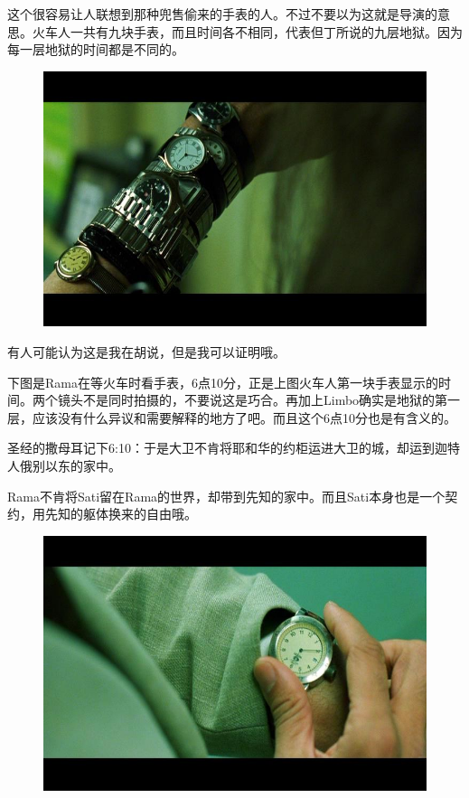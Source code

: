 \documentclass[UTF8]{ctexart}
\begin{document}
这个很容易让人联想到那种兜售偷来的手表的人。不过不要以为这就是导演的意思。火车人一共有九块手表，而且时间各不相同，代表但丁所说的九层地狱。因为每一层地狱的时间都是不同的。

\begin{figure}[htb]
\centering
\includegraphics[width=0.5\linewidth]{fig/058d77c67f85e61b9d163da9.jpg}
\end{figure}

有人可能认为这是我在胡说，但是我可以证明哦。

下图是Rama在等火车时看手表，6点10分，正是上图火车人第一块手表显示的时间。两个镜头不是同时拍摄的，不要说这是巧合。再加上Limbo确实是地狱的第一层，应该没有什么异议和需要解释的地方了吧。而且这个6点10分也是有含义的。

圣经的撒母耳记下6:10：于是大卫不肯将耶和华的约柜运进大卫的城，却运到迦特人俄别以东的家中。

Rama不肯将Sati留在Rama的世界，却带到先知的家中。而且Sati本身也是一个契约，用先知的躯体换来的自由哦。

\begin{figure}[htb]
\centering
\includegraphics[width=0.5\linewidth]{fig/759c98255a5b746034a80fa9.jpg}
\end{figure}
\end{document}
